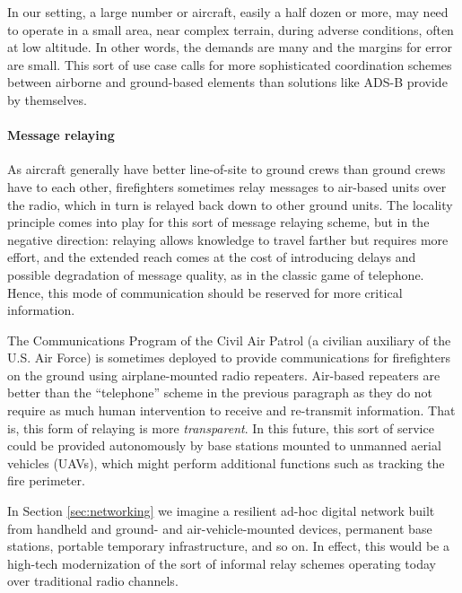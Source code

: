 \documentclass[]             %
{NASA}                       %
\theoremstyle{definition}
\begin{document}
In our setting, a large number or aircraft, easily a half dozen or
more, may need to operate in a small area, near complex terrain,
during adverse conditions, often at low altitude. In other words, the
demands are many and the margins for error are small. This sort of use
case calls for more sophisticated coordination schemes between
airborne and ground-based elements than solutions like ADS-B provide
by themselves.

\paragraph{Message relaying}
As aircraft generally have better line-of-site to ground crews than
ground crews have to each other, firefighters sometimes relay messages
to air-based units over the radio, which in turn is relayed back down
to other ground units. The locality principle comes into play for this
sort of message relaying scheme, but in the negative direction:
relaying allows knowledge to travel farther but requires more effort,
and the extended reach comes at the cost of introducing delays and
possible degradation of message quality, as in the classic game of
telephone. Hence, this mode of communication should be reserved for
more critical information.

The Communications Program of the Civil Air Patrol (a civilian
auxiliary of the U.S. Air Force) is sometimes deployed to provide
communications for firefighters on the ground using airplane-mounted
radio repeaters. Air-based repeaters are better than the ``telephone''
scheme in the previous paragraph as they do not require as much human
intervention to receive and re-transmit information. That is, this
form of relaying is more \emph{transparent}. In this future, this sort
of service could be provided autonomously by base stations mounted to
unmanned aerial vehicles (UAVs), which might perform additional
functions such as tracking the fire perimeter.

In Section \ref{sec:networking} we imagine a resilient ad-hoc digital
network built from handheld and ground- and air-vehicle-mounted
devices, permanent base stations, portable temporary infrastructure,
and so on. In effect, this would be a high-tech modernization of the
sort of informal relay schemes operating today over traditional radio
channels.

\end{document}

